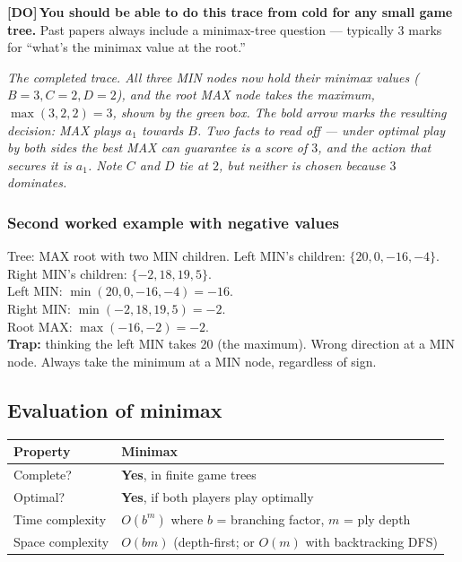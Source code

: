 \documentclass[11pt, a4paper]{article}
\newcommand{\thead}[1]{\textbf{#1}}
\newcommand{\doflag}{\textcolor{defBd}{\textbf{[DO]}}\,}
\begin{document}
\doflag{}\textbf{You should be able to do this trace from cold for any small game tree.} Past papers always include a minimax-tree question — typically 3 marks for ``what's the minimax value at the root.''

\begin{center}

\footnotesize\textit{The completed trace. All three MIN nodes now hold their minimax values ($B=3, C=2, D=2$), and the root MAX node takes the maximum, $\max(3,2,2)=3$, shown by the green box. The bold arrow marks the resulting decision: MAX plays $a_1$ towards $B$. Two facts to read off --- under optimal play by both sides the best MAX can guarantee is a score of $3$, and the action that secures it is $a_1$. Note $C$ and $D$ tie at $2$, but neither is chosen because $3$ dominates.}
\end{center}

\subsubsection*{Second worked example with negative values}

\begin{exbox}
Tree: MAX root with two MIN children. Left MIN's children: $\{20, 0, -16, -4\}$. Right MIN's children: $\{-2, 18, 19, 5\}$.\\[0.3em]
Left MIN: $\min(20, 0, -16, -4) = -16$.\\
Right MIN: $\min(-2, 18, 19, 5) = -2$.\\
Root MAX: $\max(-16, -2) = -2$.\\[0.3em]
\textbf{Trap:} thinking the left MIN takes 20 (the maximum). Wrong direction at a MIN node. Always take the minimum at a MIN node, regardless of sign.
\end{exbox}

\subsection{Evaluation of minimax}

\begin{center}
\renewcommand{\arraystretch}{1.25}
\begin{tabular}{@{}p{4cm}p{10cm}@{}}
\toprule
\thead{Property} & \thead{Minimax} \\
\midrule
Complete?         & \textbf{Yes}, in finite game trees \\
Optimal?          & \textbf{Yes}, if both players play optimally \\
Time complexity   & $O(b^m)$ where $b$ = branching factor, $m$ = ply depth \\
Space complexity  & $O(b m)$ (depth-first; or $O(m)$ with backtracking DFS) \\
\bottomrule
\end{tabular}
\end{center}
\end{document}
